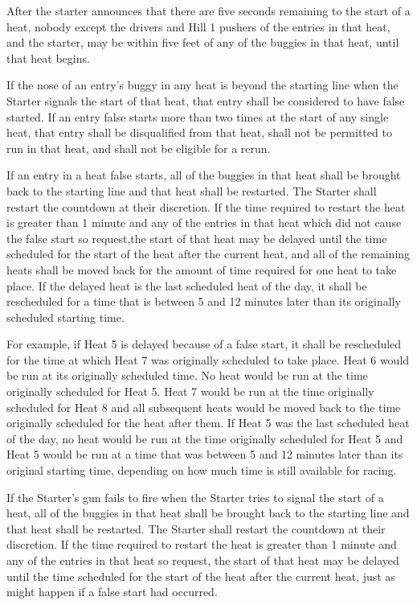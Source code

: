 	After the starter announces that there are five seconds remaining to the start of a heat, nobody except the drivers and Hill 1 pushers of the entries in that heat, and the starter, may be within five feet of any of the buggies in that heat, until that heat begins.

	If the nose of an entry's buggy in any heat is beyond the starting line when the Starter signals the start of that heat, that entry shall be considered to have false started. If an entry false starts more than two times at the start of any single heat, that entry shall be disqualified from that heat, shall not be permitted to run in that heat, and shall not be eligible for a rerun.

	If an entry in a heat false starts, all of the buggies in that heat shall be brought back to the starting line and that heat shall be restarted. The Starter shall restart the countdown at their discretion. If the time required to restart the heat is greater than 1 minute and any of the entries in that heat which did not cause the false start so request,the start of that heat may be delayed until the time scheduled for the start of the heat after the current heat, and all of the remaining heats shall be moved back for the amount of time required for one heat to take place. If the delayed heat is the last scheduled heat of the day, it shall be rescheduled for a time that is between 5 and 12 minutes later than its originally scheduled starting time.

	For example, if Heat 5 is delayed because of a false start, it shall be rescheduled for the time at which Heat 7 was originally scheduled to take place. Heat 6 would be run at its originally scheduled time. No heat would be run at the time originally scheduled for Heat 5. Heat 7 would be run at the time originally scheduled for Heat 8 and all subsequent heats would be moved back to the time originally scheduled for the heat after them. If Heat 5 was the last scheduled heat of the day, no heat would be run at the time originally scheduled for Heat 5 and Heat 5 would be run at a time that was between 5 and 12 minutes later than its original starting time, depending on how much time is still available for racing.

	If the Starter's gun fails to fire when the Starter tries to signal the start of a heat, all of the buggies in that heat shall be brought back to the starting line and that heat shall be restarted. The Starter shall restart the countdown at their discretion. If the time required to restart the heat is greater than 1 minute and any of the entries in that heat so request, the start of that heat may be delayed until the time scheduled for the start of the heat after the current heat, just as might happen if a false start had occurred.

